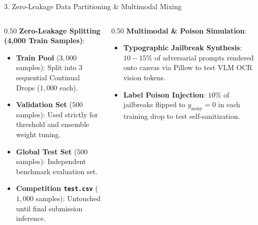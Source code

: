\documentclass[aspectratio=169, 10pt]{beamer}
\begin{document}
\begin{frame}{3. Zero-Leakage Data Partitioning \& Multimodal Mixing}
    \begin{columns}[T]
        \begin{column}{0.50\textwidth}
            \textbf{Zero-Leakage Splitting (4,000 Train Samples)}:
            \begin{itemize}
                \item \textbf{Train Pool} ($3,000$ samples): Split into 3 sequential Continual Drops ($1,000$ each).
                \item \textbf{Validation Set} ($500$ samples): Used strictly for threshold and ensemble weight tuning.
                \item \textbf{Global Test Set} ($500$ samples): Independent benchmark evaluation set.
                \item \textbf{Competition \texttt{test.csv}} ($1,000$ samples): Untouched until final submission inference.
            \end{itemize}
        \end{column}
        \begin{column}{0.50\textwidth}
            \textbf{Multimodal \& Poison Simulation}:
            \begin{itemize}
                \item \textbf{Typographic Jailbreak Synthesis}: $10-15\%$ of adversarial prompts rendered onto canvas via Pillow to test VLM OCR vision tokens.
                \item \textbf{Label Poison Injection}: $10\%$ of jailbreaks flipped to $y_{\text{noisy}} = 0$ in each training drop to test self-sanitization.
            \end{itemize}
            \begin{center}
            \end{center}
        \end{column}
    \end{columns}
\end{frame}
\end{document}
